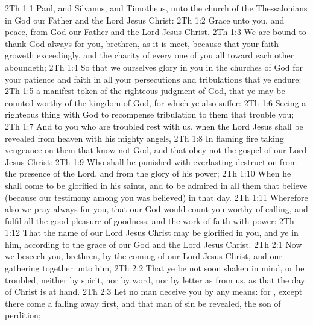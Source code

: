 \vs 2Th 1:1 Paul, and Silvanus, and Timotheus, unto the church of the Thessalonians in God our Father and the Lord Jesus Christ:
\vs 2Th 1:2 Grace unto you, and peace, from God our Father and the Lord Jesus Christ.
\vs 2Th 1:3 We are bound to thank God always for you, brethren, as it is meet, because that your faith groweth exceedingly, and the charity of every one of you all toward each other aboundeth;
\vs 2Th 1:4 So that we ourselves glory in you in the churches of God for your patience and faith in all your persecutions and tribulations that ye endure:
\vs 2Th 1:5  a manifest token of the righteous judgment of God, that ye may be counted worthy of the kingdom of God, for which ye also suffer:
\vs 2Th 1:6 Seeing  a righteous thing with God to recompense tribulation to them that trouble you;
\vs 2Th 1:7 And to you who are troubled rest with us, when the Lord Jesus shall be revealed from heaven with his mighty angels,
\vs 2Th 1:8 In flaming fire taking vengeance on them that know not God, and that obey not the gospel of our Lord Jesus Christ:
\vs 2Th 1:9 Who shall be punished with everlasting destruction from the presence of the Lord, and from the glory of his power;
\vs 2Th 1:10 When he shall come to be glorified in his saints, and to be admired in all them that believe (because our testimony among you was believed) in that day.
\vs 2Th 1:11 Wherefore also we pray always for you, that our God would count you worthy of  calling, and fulfil all the good pleasure of  goodness, and the work of faith with power:
\vs 2Th 1:12 That the name of our Lord Jesus Christ may be glorified in you, and ye in him, according to the grace of our God and the Lord Jesus Christ.
\vs 2Th 2:1 Now we beseech you, brethren, by the coming of our Lord Jesus Christ, and  our gathering together unto him,
\vs 2Th 2:2 That ye be not soon shaken in mind, or be troubled, neither by spirit, nor by word, nor by letter as from us, as that the day of Christ is at hand.
\vs 2Th 2:3 Let no man deceive you by any means: for , except there come a falling away first, and that man of sin be revealed, the son of perdition;

